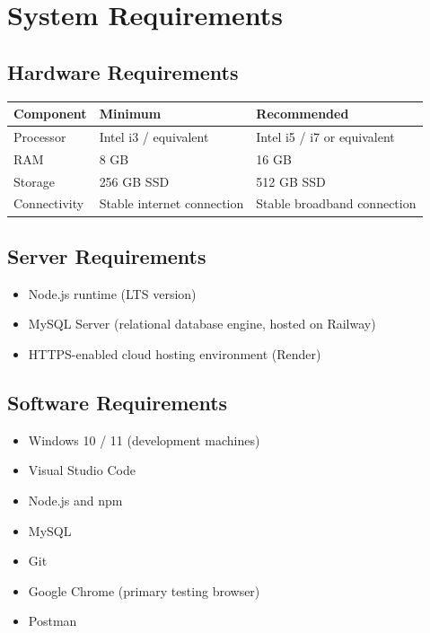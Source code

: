 \documentclass[11pt,a4paper]{report}
\begin{document}
\chapter{System Requirements}

\section{Hardware Requirements}
\begin{longtable}{@{}p{3.5cm}p{4.7cm}p{4.7cm}@{}}
\toprule
\rowcolor{pine!10}\textbf{Component} & \textbf{Minimum} & \textbf{Recommended} \\
\midrule
\endhead
Processor & Intel i3 / equivalent & Intel i5 / i7 or equivalent \\
RAM & 8 GB & 16 GB \\
Storage & 256 GB SSD & 512 GB SSD \\
Connectivity & Stable internet connection & Stable broadband connection \\
\bottomrule
\end{longtable}

\section{Server Requirements}
\begin{itemize}[leftmargin=1.3em]
  \item Node.js runtime (LTS version)
  \item MySQL Server (relational database engine, hosted on Railway)
  \item HTTPS-enabled cloud hosting environment (Render)
\end{itemize}

\section{Software Requirements}
\begin{itemize}[leftmargin=1.3em]
  \item Windows 10 / 11 (development machines)
  \item Visual Studio Code
  \item Node.js and npm
  \item MySQL
  \item Git
  \item Google Chrome (primary testing browser)
  \item Postman
\end{itemize}
\end{document}
